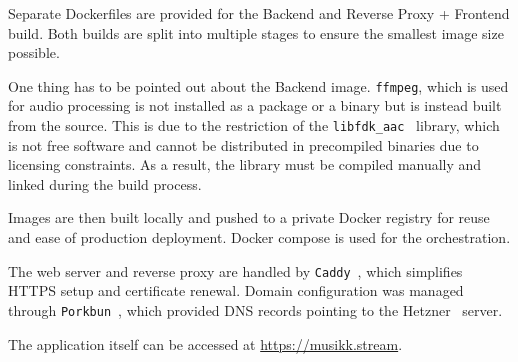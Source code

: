 Separate Dockerfiles are provided for the Backend and Reverse Proxy + Frontend build.
Both builds are split into multiple stages to ensure the smallest image size possible.

One thing has to be pointed out about the Backend image. \texttt{ffmpeg}, which is used for audio
processing is not installed as a package or a binary but is instead built from the source.
This is due to the restriction of the \texttt{libfdk\_aac}~\cite{libfdkaac} library, which is not free software
and cannot be distributed in precompiled binaries due to licensing constraints.
As a result, the library must be compiled manually and linked during the build process.

Images are then built locally and pushed to a private Docker registry
for reuse and ease of production deployment. Docker compose is used for the
orchestration.

The web server and reverse proxy are handled by \texttt{Caddy}~\cite{caddy},
which simplifies HTTPS setup and certificate renewal.
Domain configuration was managed through \texttt{Porkbun}~\cite{porkbun},
which provided DNS records pointing to the Hetzner~\cite{hetzner} server.

The application itself can be accessed at \url{https://musikk.stream}.